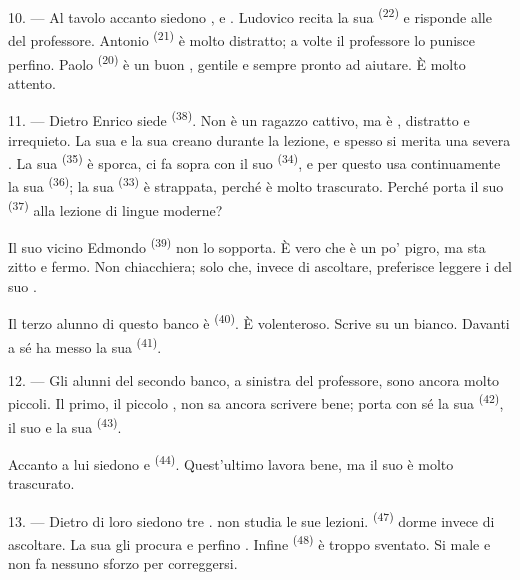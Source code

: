 10. --- Al tavolo accanto siedono ,  e
. Ludovico recita la sua  \textsuperscript{(22)} e
risponde alle  del professore. Antonio \textsuperscript{(21)} è molto
distratto; a volte il professore lo punisce perfino. Paolo \textsuperscript{(20)} è un
buon , gentile e sempre pronto ad aiutare. È molto attento.

\VUsaut{4.2mm}
\VUsaut{3.2mm}

11. --- Dietro Enrico siede  \textsuperscript{(38)}. Non è un ragazzo
cattivo, ma è , distratto e irrequieto. La sua
 e la sua  creano  durante
la lezione, e spesso si merita una severa . La sua
 \textsuperscript{(35)} è sporca, ci fa sopra
 con il suo  \textsuperscript{(34)}, e
per questo usa continuamente la sua  \textsuperscript{(36)}; la sua
 \textsuperscript{(33)} è strappata, perché è molto trascurato.
Perché porta il suo  \textsuperscript{(37)} alla lezione di lingue
moderne?

Il suo vicino Edmondo \textsuperscript{(39)} non lo sopporta. È vero che è un po'
pigro, ma sta zitto e fermo. Non chiacchiera; solo che, invece di ascoltare,
preferisce leggere i  del suo .

Il terzo alunno di questo banco è  \textsuperscript{(40)}. È
volenteroso. Scrive su un  bianco. Davanti a sé ha messo la
sua  \textsuperscript{(41)}.

12. --- Gli alunni del secondo banco, a sinistra del professore, sono ancora molto
piccoli. Il primo, il piccolo , non sa ancora scrivere bene; porta con
sé la sua  \textsuperscript{(42)}, il suo  e la
sua  \textsuperscript{(43)}.

Accanto a lui siedono  e  \textsuperscript{(44)}.
Quest'ultimo lavora bene, ma il suo  è molto trascurato.

13. --- Dietro di loro siedono tre .  non studia le sue
lezioni.  \textsuperscript{(47)} dorme invece di ascoltare. La sua
 gli procura  e perfino . Infine
 \textsuperscript{(48)} è troppo sventato. Si  male
e non fa nessuno sforzo per correggersi.

